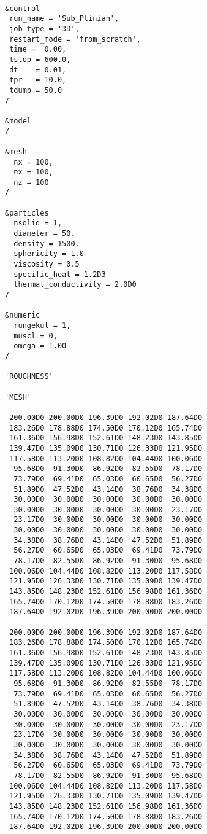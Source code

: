\begin{verbatim}

&control
 run_name = 'Sub_Plinian',
 job_type = '3D',
 restart_mode = 'from_scratch',
 time =  0.00,
 tstop = 600.0,
 dt    = 0.01,
 tpr   = 10.0,
 tdump = 50.0
/

&model
/

&mesh
  nx = 100,
  nx = 100,
  nz = 100
/

&particles
  nsolid = 1, 
  diameter = 50.
  density = 1500.
  sphericity = 1.0
  viscosity = 0.5
  specific_heat = 1.2D3
  thermal_conductivity = 2.0D0
/

&numeric
  rungekut = 1,
  muscl = 0,
  omega = 1.00
/

'ROUGHNESS'

'MESH'

 200.00D0 200.00D0 196.39D0 192.02D0 187.64D0 
 183.26D0 178.88D0 174.50D0 170.12D0 165.74D0
 161.36D0 156.98D0 152.61D0 148.23D0 143.85D0 
 139.47D0 135.09D0 130.71D0 126.33D0 121.95D0
 117.58D0 113.20D0 108.82D0 104.44D0 100.06D0 
  95.68D0  91.30D0  86.92D0  82.55D0  78.17D0
  73.79D0  69.41D0  65.03D0  60.65D0  56.27D0
  51.89D0  47.52D0  43.14D0  38.76D0  34.38D0
  30.00D0  30.00D0  30.00D0  30.00D0  30.00D0
  30.00D0  30.00D0  30.00D0  30.00D0  23.17D0
  23.17D0  30.00D0  30.00D0  30.00D0  30.00D0
  30.00D0  30.00D0  30.00D0  30.00D0  30.00D0
  34.38D0  38.76D0  43.14D0  47.52D0  51.89D0
  56.27D0  60.65D0  65.03D0  69.41D0  73.79D0
  78.17D0  82.55D0  86.92D0  91.30D0  95.68D0
 100.06D0 104.44D0 108.82D0 113.20D0 117.58D0
 121.95D0 126.33D0 130.71D0 135.09D0 139.47D0 
 143.85D0 148.23D0 152.61D0 156.98D0 161.36D0
 165.74D0 170.12D0 174.50D0 178.88D0 183.26D0 
 187.64D0 192.02D0 196.39D0 200.00D0 200.00D0

 200.00D0 200.00D0 196.39D0 192.02D0 187.64D0 
 183.26D0 178.88D0 174.50D0 170.12D0 165.74D0
 161.36D0 156.98D0 152.61D0 148.23D0 143.85D0 
 139.47D0 135.09D0 130.71D0 126.33D0 121.95D0
 117.58D0 113.20D0 108.82D0 104.44D0 100.06D0 
  95.68D0  91.30D0  86.92D0  82.55D0  78.17D0
  73.79D0  69.41D0  65.03D0  60.65D0  56.27D0
  51.89D0  47.52D0  43.14D0  38.76D0  34.38D0
  30.00D0  30.00D0  30.00D0  30.00D0  30.00D0
  30.00D0  30.00D0  30.00D0  30.00D0  23.17D0
  23.17D0  30.00D0  30.00D0  30.00D0  30.00D0
  30.00D0  30.00D0  30.00D0  30.00D0  30.00D0
  34.38D0  38.76D0  43.14D0  47.52D0  51.89D0
  56.27D0  60.65D0  65.03D0  69.41D0  73.79D0
  78.17D0  82.55D0  86.92D0  91.30D0  95.68D0
 100.06D0 104.44D0 108.82D0 113.20D0 117.58D0
 121.95D0 126.33D0 130.71D0 135.09D0 139.47D0 
 143.85D0 148.23D0 152.61D0 156.98D0 161.36D0
 165.74D0 170.12D0 174.50D0 178.88D0 183.26D0 
 187.64D0 192.02D0 196.39D0 200.00D0 200.00D0


\end{verbatim}
